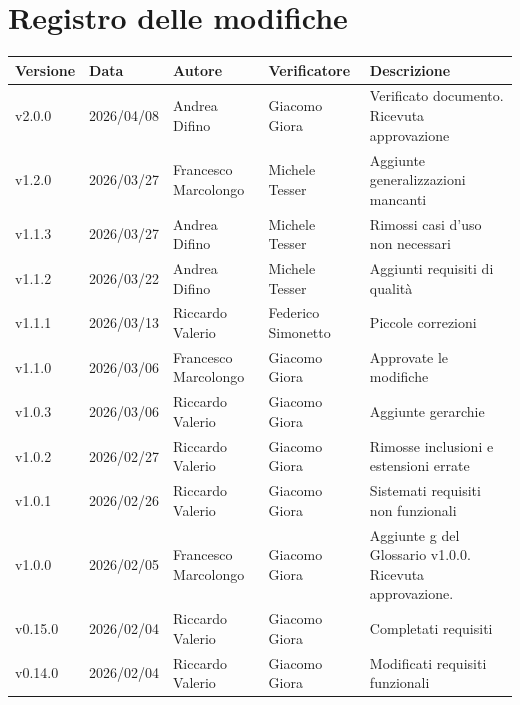 ﻿\documentclass[a4paper,12pt]{article}
\newcommand{\DataUltimaModifica}{2026/04/08}
\newcommand{\VersioneDocumento}{v2.0.0} %
\begin{document}
\section*{Registro delle modifiche}
\begin{center}
    \begin{tabularx}{\textwidth}{|l|l|l|X|X|}
        \hline
        \rowcolor{lightgray}
        \textbf{Versione}  & \textbf{Data}       & \textbf{Autore}      & \textbf{Verificatore} & \textbf{Descrizione} \\
        \hline
        \VersioneDocumento & \DataUltimaModifica & Andrea Difino & Giacomo Giora & Verificato documento. Ricevuta approvazione \\
        \hline
        v1.2.0 & 2026/03/27 & Francesco Marcolongo & Michele Tesser & Aggiunte generalizzazioni mancanti \\
        \hline
        v1.1.3 & 2026/03/27 & Andrea Difino & Michele Tesser & Rimossi casi d'uso non necessari \\
        \hline
        v1.1.2 & 2026/03/22 & Andrea Difino & Michele Tesser & Aggiunti requisiti di qualità \\
        \hline
        v1.1.1 & 2026/03/13 & Riccardo Valerio & Federico Simonetto & Piccole correzioni \\
        \hline
        v1.1.0 & 2026/03/06 & Francesco Marcolongo     & Giacomo Giora         & Approvate le modifiche                     \\
        \hline
        v1.0.3 & 2026/03/06 & Riccardo Valerio     & Giacomo Giora         & Aggiunte gerarchie                      \\
        \hline
        v1.0.2 & 2026/02/27 & Riccardo Valerio     & Giacomo Giora         & Rimosse inclusioni e estensioni errate                      \\
        \hline
        v1.0.1             & 2026/02/26          & Riccardo Valerio     & Giacomo Giora         & Sistemati requisiti non funzionali                          \\
        \hline
        v1.0.0             & 2026/02/05          & Francesco Marcolongo & Giacomo Giora         & Aggiunte g del Glossario v1.0.0. Ricevuta approvazione.     \\
        \hline
        v0.15.0            & 2026/02/04          & Riccardo Valerio     & Giacomo Giora         & Completati requisiti                                        \\
        \hline
        v0.14.0            & 2026/02/04          & Riccardo Valerio     & Giacomo Giora         & Modificati requisiti funzionali                             \\

\end{tabularx}
\end{center}
\end{document}
